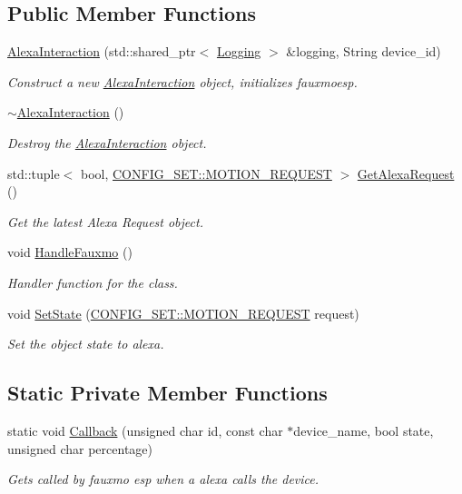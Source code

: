 \subsection*{Public Member Functions}
\begin{DoxyCompactItemize}
\item 
\hyperlink{classAlexaInteraction_acae42695173d2ad4b9296d64d4a2dbb2}{Alexa\+Interaction} (std\+::shared\+\_\+ptr$<$ \hyperlink{classLogging}{Logging} $>$ \&logging, String device\+\_\+id)
\begin{DoxyCompactList}\small\item\em Construct a new \hyperlink{classAlexaInteraction}{Alexa\+Interaction} object, initializes fauxmoesp. \end{DoxyCompactList}\item 
\hyperlink{classAlexaInteraction_a469eb0982e4de6c665b46e4b510b2503}{$\sim$\+Alexa\+Interaction} ()
\begin{DoxyCompactList}\small\item\em Destroy the \hyperlink{classAlexaInteraction}{Alexa\+Interaction} object. \end{DoxyCompactList}\item 
std\+::tuple$<$ bool, \hyperlink{structCONFIG__SET_1_1MOTION__REQUEST}{C\+O\+N\+F\+I\+G\+\_\+\+S\+E\+T\+::\+M\+O\+T\+I\+O\+N\+\_\+\+R\+E\+Q\+U\+E\+ST} $>$ \hyperlink{classAlexaInteraction_afbee88db6199e92089d3d700a09bae85}{Get\+Alexa\+Request} ()
\begin{DoxyCompactList}\small\item\em Get the latest Alexa Request object. \end{DoxyCompactList}\item 
void \hyperlink{classAlexaInteraction_a8a7cf8511a1f9e1f40a752313d656b3d}{Handle\+Fauxmo} ()
\begin{DoxyCompactList}\small\item\em Handler function for the class. \end{DoxyCompactList}\item 
void \hyperlink{classAlexaInteraction_a223ede390439dbf2e1cecb925dc5b983}{Set\+State} (\hyperlink{structCONFIG__SET_1_1MOTION__REQUEST}{C\+O\+N\+F\+I\+G\+\_\+\+S\+E\+T\+::\+M\+O\+T\+I\+O\+N\+\_\+\+R\+E\+Q\+U\+E\+ST} request)
\begin{DoxyCompactList}\small\item\em Set the object state to alexa. \end{DoxyCompactList}\end{DoxyCompactItemize}
\subsection*{Static Private Member Functions}
\begin{DoxyCompactItemize}
\item 
static void \hyperlink{classAlexaInteraction_a32ec2c496edced2e4e62d9c562fa9fa9}{Callback} (unsigned char id, const char $\ast$device\+\_\+name, bool state, unsigned char percentage)
\begin{DoxyCompactList}\small\item\em Gets called by fauxmo esp when a alexa calls the device. \end{DoxyCompactList}\end{DoxyCompactItemize}
